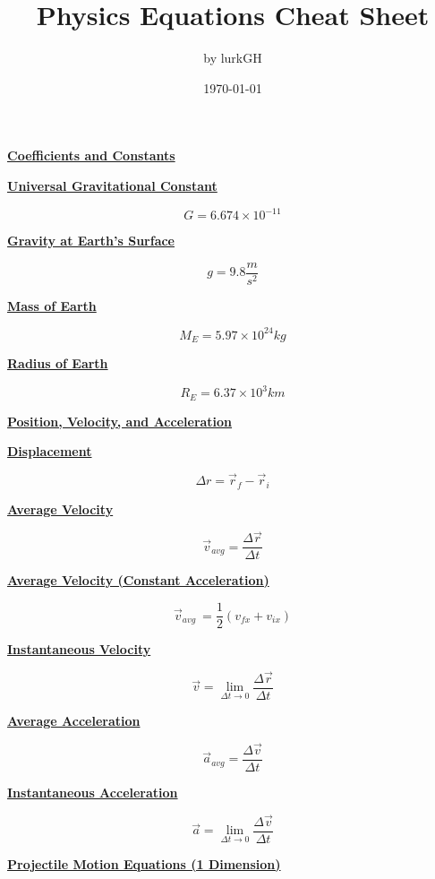 \documentclass[12pt, letterpaper]{article}
\title{\textbf{Physics Equations Cheat Sheet}}
\author{by lurkGH}
\date{\today}
\begin{document}
\maketitle

\noindent\makebox[\linewidth]{\rule{\paperwidth}{0.4pt}}
\vspace{1em}


\Large{\centerline{\textbf{\underline{Coefficients and Constants}}}}
\vspace{1em}

\normalsize{\centerline{\textbf{\underline{Universal Gravitational Constant}}}}
\[G = 6.674 \times 10^{-11}\]

\normalsize{\centerline{\textbf{\underline{Gravity at Earth's Surface}}}}
\[g = 9.8 \frac{m}{s^2}\]

\normalsize{\centerline{\textbf{\underline{Mass of Earth}}}}
\[M_E = 5.97 \times 10^{24} kg\]

\normalsize{\centerline{\textbf{\underline{Radius of Earth}}}}
\[R_E = 6.37 \times 10^3 km\]

\newpage

\Large{\centerline{\textbf{\underline{Position, Velocity, and Acceleration}}}}
\vspace{1em}

\normalsize{\centerline{\textbf{\underline{Displacement}}}}
\[\Delta r = \vec{r}_f - \vec{r}_i\]

\centerline{\textbf{\underline{Average Velocity}}}
\[\vec{v}_{avg} = \frac{\Delta \vec{r}}{\Delta t}\]

\centerline{\textbf{\underline{Average Velocity (Constant Acceleration)}}}
\[\vec{v}_{avg}\ = \frac{1}{2} (v_{fx} + v_{ix})\]

\centerline{\textbf{\underline{Instantaneous Velocity}}}
\[\vec{v} = \lim_{\Delta t \to 0} \frac{\Delta \vec{r}}{\Delta t}\]

\centerline{\textbf{\underline{Average Acceleration}}}
\[\vec{a}_{avg} = \frac{\Delta \vec{v}}{\Delta t}\]

\centerline{\textbf{\underline{Instantaneous Acceleration}}}
\[\vec{a} = \lim_{\Delta t \to 0} \frac{\Delta \vec{v}}{\Delta t}\]

\newpage

\Large{\centerline{\textbf{\underline{Projectile Motion Equations (1 Dimension)}}}}
\vspace{1em}
\end{document}
